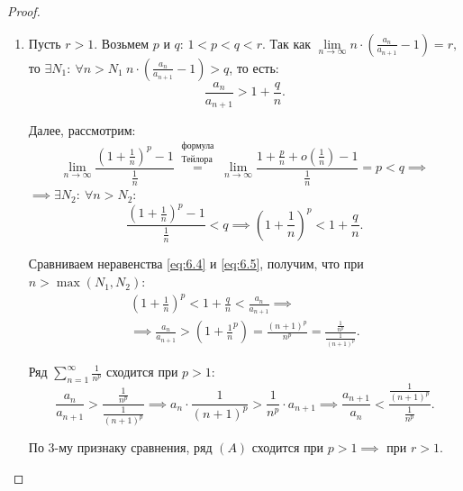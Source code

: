 \begin{proof}\leavevmode
    \begin{enumerate}
        \item Пусть $r>1$. Возьмем $p$ и $q$: $ 1 < p < q < r $. Так как $ \underset{n\rightarrow\infty}{\lim}n\cdot\left(\frac{a_n}{a_{n+1}} - 1\right) = r, $ то $\exists N_1: \ \forall n > N_1 \ n\cdot\left(\frac{a_n}{a_{n+1}} - 1\right) > q$, то есть:
              \begin{equation}\label{eq:6.4}
                  \frac{a_n}{a_{n+1}} > 1 + \frac{q}{n}.
              \end{equation}

              Далее, рассмотрим:
              \[
                  \underset{n\rightarrow\infty}{\lim}\frac{(1 + \frac{1}{n})^p - 1}{\frac{1}{n}} \overset{\begin{array}{c}
                          \text{формула} \\
                          \text{Тейлора}
                      \end{array}}{=} \underset{n\rightarrow\infty}{\lim}\frac{1 + \frac{p}{n} + o(\frac{1}{n}) - 1}{\frac{1}{n}} = p < q \implies
              \]
              $\implies \exists N_2: \ \forall n > N_2$:
              \begin{equation}\label{eq:6.5}
                  \frac{(1 + \frac{1}{n})^p - 1}{\frac{1}{n}} < q \implies \left(1 + \frac{1}{n}\right)^p < 1 + \frac{q}{n}.
              \end{equation}

              Сравниваем неравенства \ref{eq:6.4} и \ref{eq:6.5}, получим, что при \\
              $n > \max(N_1,N_2)$:
              \begin{multline*}
                  \left(1 + \frac{1}{n}\right)^p < 1 + \frac{q}{n} < \frac{a_n}{a_{n+1}} \implies \\
                  \implies \frac{a_n}{a_{n+1}} > \left(1 + \frac{1}{n}^p\right) = \frac{(n+1)^p}{n^p} = \frac{\frac{1}{n^p}}{\frac{1}{(n+1)^p}}.
              \end{multline*}

              Ряд $\sum_{n=1}^{\infty}\frac{1}{n^p}$ сходится при $p > 1$:
              \[
                  \frac{a_n}{a_{n+1}} > \frac{\frac{1}{n^p}}{\frac{1}{(n+1)^p}} \implies a_n \cdot \frac{1}{(n+1)^p} > \frac{1}{n^p} \cdot a_{n+1} \implies \frac{a_{n+1}}{a_n} < \frac{\frac{1}{(n+1)^p}}{\frac{1}{n^p}}.
              \]

              По 3-му признаку сравнения, ряд $(A)$ сходится при $p > 1 \implies$ при $r > 1$.


\end{enumerate}
\end{proof}
